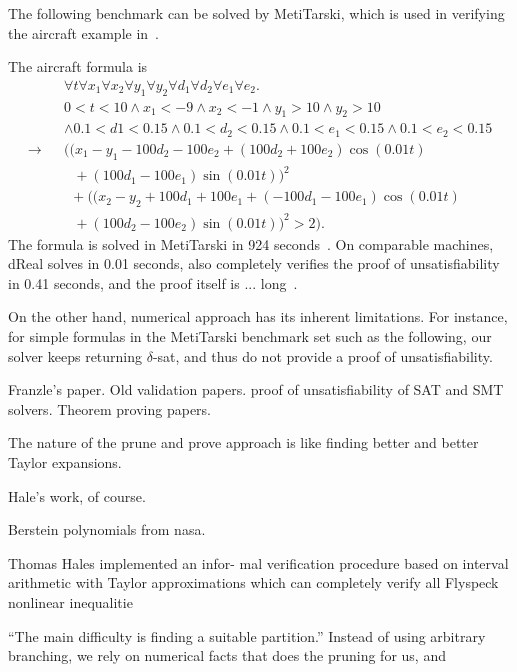 \documentclass[envcountsect]{llncs}
\begin{document}
The following benchmark can be solved by MetiTarski, which is used in verifying
the aircraft example in~\cite{}. 
\begin{example}[Aircraft]
The aircraft formula is
\begin{eqnarray*}
& &\forall t \forall x_1\forall x_2 \forall y_1\forall y_2\forall
d_1\forall d_2\forall e_1\forall e_2. \\
& &0<t<10\wedge x_1<-9 \wedge x_2<-1\wedge
y_1>10 \wedge y_2>10\\
& & \wedge 0.1<d1< 0.15\wedge 0.1<d_2<0.15 \wedge
0.1<e_1<0.15\wedge 0.1<e_2<0.15 \\
\rightarrow & &\Big(
\Big(x_1-y_1-100d_2-100e_2+(100d_2+100e_2)\cos(0.01t)\\
& &\ \ \ + (100d_1
-100e_1)\sin(0.01t)\Big)^2\\
& & \ \ +\Big((x_2-y_2+100d_1+100e_1+(-100d_1-100e_1)\cos(0.
0 1 t ) \\
& &\ \ \  + (100d_2 - 100e_2)\sin(0.01t)\Big)^2 > 2\Big).
\end{eqnarray*}
The formula is solved in MetiTarski in 924
seconds~\cite{}. On comparable machines, dReal solves in 0.01 seconds, also
completely verifies the proof of unsatisfiability in 0.41 seconds, and the
proof itself is ... long~\cite{}. 
\end{example}
On the other hand, numerical approach has its inherent limitations. For
instance, for simple formulas in the MetiTarski benchmark set such as the
following, our solver keeps returning $\delta$-sat, and thus do not provide a
proof of unsatisfiability. 
\begin{example}
 
\end{example}

Franzle's paper. Old validation papers. proof of unsatisfiability of SAT and
SMT solvers. Theorem proving papers.

The nature of the prune and prove approach is like finding better and better
Taylor expansions. 

Hale's work, of course. 

Berstein polynomials from nasa. 

Thomas Hales implemented an infor-
mal verification procedure based on interval arithmetic with Taylor
approximations which
can completely verify all Flyspeck nonlinear inequalitie

``The main difficulty is finding a suitable partition.'' Instead of using
arbitrary branching, we rely on numerical facts that does the pruning for us,
and 
\end{document}
